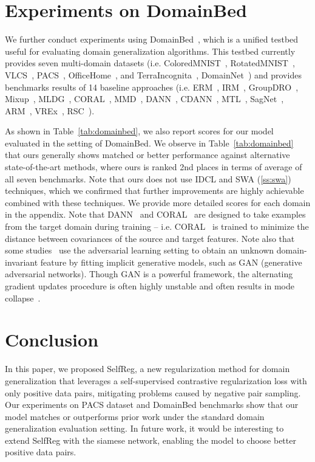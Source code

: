\documentclass[10pt,twocolumn,letterpaper]{article}
\begin{document}
\section{Experiments on DomainBed}\label{sec:domainbed}
We further conduct experiments using DomainBed~\cite{gulrajani2020search}, which is a unified testbed useful for evaluating domain generalization algorithms. This testbed currently provides seven multi-domain datasets (i.e. ColoredMNIST~\cite{arjovsky2019invariant}, RotatedMNIST~\cite{ghifary2015domain}, VLCS~\cite{fang2013unbiased}, PACS~\cite{Li2017dg}, OfficeHome~\cite{venkateswara2017deep}, and TerraIncognita~\cite{beery2018recognition}, DomainNet~\cite{peng2019moment}) and provides benchmarks results of 14 baseline approaches (i.e. ERM~\cite{vapnik1999overview}, IRM~\cite{arjovsky2019invariant}, GroupDRO~\cite{sagawa2019distributionally}, Mixup~\cite{yan2020improve}, MLDG~\cite{li2018learning}, CORAL~\cite{sun2016deep}, MMD~\cite{li2018domain}, DANN~\cite{ganin2016domain}, CDANN~\cite{li2018deep}, MTL~\cite{blanchard2017domain}, SagNet~\cite{nam2019reducing}, ARM~\cite{zhang2020adaptive}, VREx~\cite{krueger2020out}, RSC~\cite{huangRSC2020}). 

As shown in Table~\ref{tab:domainbed}, we also report scores for our model evaluated in the setting of DomainBed. We observe in Table~\ref{tab:domainbed} that ours generally shows matched or better performance against alternative state-of-the-art methods, where ours is ranked 2nd places in terms of average of all seven benchmarks. Note that ours does not use IDCL and SWA (\ref{ss:swa}) techniques, which we confirmed that further improvements are highly achievable combined with these techniques. We provide more detailed scores for each domain in the appendix. Note that DANN~\cite{ganin2016domain} and CORAL~\cite{sun2016deep} are designed to take examples from the target domain during training -- i.e. CORAL~\cite{sun2016deep} is trained to minimize the distance between covariances of the source and target features. Note also that some studies~\cite{nam2019reducing, ganin2016domain, li2018deep} use the adversarial learning setting to obtain an unknown domain-invariant feature by fitting implicit generative models, such as GAN (generative adversarial networks). Though GAN is a powerful framework, the alternating gradient updates procedure is often highly unstable and often results in mode collapse~\cite{kodali2017convergence}.


\section{Conclusion}
In this paper, we proposed SelfReg, a new regularization method for domain generalization that leverages a self-supervised contrastive regularization loss with only positive data pairs, mitigating  problems caused by negative pair sampling.  Our experiments on PACS dataset and DomainBed benchmarks show that our model matches or outperforms prior work under the standard domain generalization evaluation setting.  In future work, it would be interesting to extend SelfReg with the siamese network, enabling the model to choose better positive data pairs.
\end{document}

